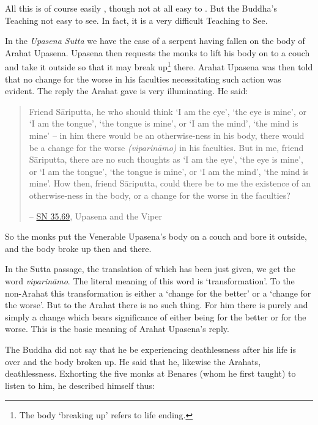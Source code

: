 All this is of course easily , though not at all easy to . But the Buddha's Teaching  not easy to see. In fact, it is a very difficult Teaching to See.

In the \emph{Upasena Sutta} we have the case of a serpent having fallen on the body of Arahat Upasena. Upasena then requests the monks to lift his body on to a couch and take it outside so that it may break up\footnote{The body `breaking up' refers to life ending.} there. Arahat Upasena was then told that no change for the worse in his faculties necessitating such action was evident. The reply the Arahat gave is very illuminating. He said:

\begin{quote}
Friend Sāriputta, he who should think `I am the eye', `the eye is mine', or `I am the tongue', `the tongue is mine', or `I am the mind', `the mind is mine' -- in him there would be an otherwise-ness in his body, there would be a change for the worse \emph{(viparināmo)} in his faculties. But in me, friend Sāriputta, there are no such thoughts as `I am the eye', `the eye is mine', or `I am the tongue', `the tongue is mine', or `I am the mind', `the mind is mine'. How then, friend Sāriputta, could there be to me the existence of an otherwise-ness in the body, or a change for the worse in the faculties?

 -- \href{https://suttacentral.net/sn35.69/en/sujato}{SN 35.69}, Upasena and the Viper
\end{quote}

So the monks put the Venerable Upasena's body on a couch and bore it outside, and the body broke up then and there.

In the Sutta passage, the translation of which has been just given, we get the word \emph{viparināmo}. The literal meaning of this word is `transformation'. To the non-Arahat this transformation is either a `change for the better' or a `change for the worse'. But to the Arahat there is no such thing. For him there is purely and simply a change which bears  significance of either being for the better or for the worse. This is the basic meaning of Arahat Upasena's reply.

The Buddha did not say that he  be experiencing deathlessness after his life is over and the body broken up. He said that he, likewise the Arahats,  deathlessness. Exhorting the five monks at Benares (whom he first taught) to listen to him, he described himself thus:


